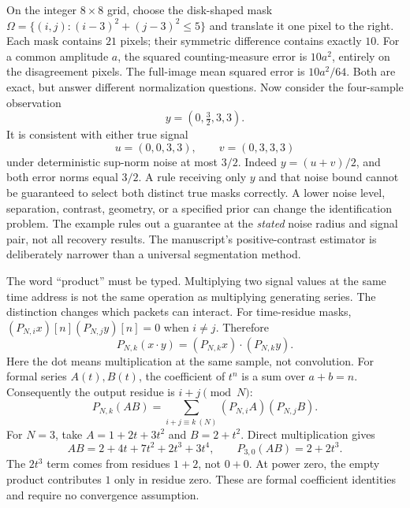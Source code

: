 On the integer $8\times8$ grid, choose the disk-shaped mask
$\Omega=\{(i,j):(i-3)^2+(j-3)^2\le5\}$ and translate it one pixel to the right. Each mask contains $21$ pixels; their symmetric difference contains exactly $10$.
For a common amplitude $a$, the squared counting-measure error is $10a^2$, entirely on the disagreement pixels. The full-image mean squared error is $10a^2/64$. Both are exact, but answer different normalization questions.
Now consider the four-sample observation
\[
y=(0,\tfrac32,3,3).
\]
It is consistent with either true signal
\[
u=(0,0,3,3),\qquad v=(0,3,3,3)
\]
under deterministic sup-norm noise at most $3/2$. Indeed $y=(u+v)/2$, and both error norms equal $3/2$. A rule receiving only $y$ and that noise bound cannot be guaranteed to select both distinct true masks correctly.
A lower noise level, separation, contrast, geometry, or a specified prior can change the identification problem. The example rules out a guarantee at the \emph{stated} noise radius and signal pair, not all recovery results. The manuscript's positive-contrast estimator is deliberately narrower than a universal segmentation method.

The word ``product'' must be typed. Multiplying two signal values at the same time address is not the same operation as multiplying generating series. The distinction changes which packets can interact.
For time-residue masks, $(P_{N,i}x)[n](P_{N,j}y)[n]=0$ when $i\ne j$. Therefore
\[
P_{N,k}(x\cdot y)=(P_{N,k}x)\cdot(P_{N,k}y).
\]
Here the dot means multiplication at the same sample, not convolution.
For formal series $A(t),B(t)$, the coefficient of $t^n$ is a sum over $a+b=n$. Consequently the output residue is $i+j\pmod N$:
\[
P_{N,k}(AB)=\sum_{i+j\equiv k\ (N)}(P_{N,i}A)(P_{N,j}B).
\]
For $N=3$, take $A=1+2t+3t^2$ and $B=2+t^2$. Direct multiplication gives
\[
AB=2+4t+7t^2+2t^3+3t^4,
\qquad P_{3,0}(AB)=2+2t^3.
\]
The $2t^3$ term comes from residues $1+2$, not $0+0$. At power zero, the empty product contributes $1$ only in residue zero. These are formal coefficient identities and require no convergence assumption.

